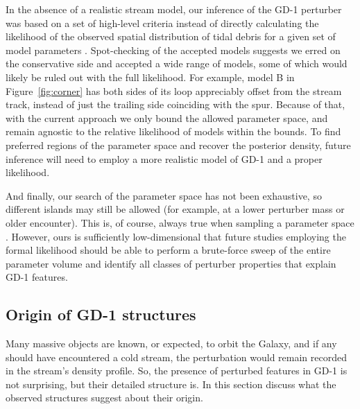 \documentclass[twocolumn]{aastex62}
\begin{document}
In the absence of a realistic stream model, our inference of the GD-1 perturber was based on a set of high-level criteria instead of directly calculating the likelihood of the observed spatial distribution of tidal debris for a given set of model parameters \citep[e.g., likelihood developed in][]{bonaca2014}.
Spot-checking of the accepted models suggests we erred on the conservative side and accepted a wide range of models, some of which would likely be ruled out with the full likelihood.
For example, model B in Figure~\ref{fig:corner} has both sides of its loop appreciably offset from the stream track, instead of just the trailing side coinciding with the spur.
Because of that, with the current approach we only bound the allowed parameter space, and remain agnostic to the relative likelihood of models within the bounds.
To find preferred regions of the parameter space and recover the posterior density, future inference will need to employ a more realistic model of GD-1 and a proper likelihood.

And finally, our search of the parameter space has not been exhaustive, so different islands may still be allowed (for example, at a lower perturber mass or older encounter).
This is, of course, always true when sampling a parameter space \citep[e.g.,][]{hoggdfm2018}.
However, ours is sufficiently low-dimensional that future studies employing the formal likelihood should be able to perform a brute-force sweep of the entire parameter volume and identify all classes of perturber properties that explain GD-1 features.

\subsection{Origin of GD-1 structures}
\label{sec:origin}
Many massive objects are known, or expected, to orbit the Galaxy, and if any should have encountered a cold stream, the perturbation would remain recorded in the stream's density profile.
So, the presence of perturbed features in GD-1 is not surprising, but their detailed structure is.
In this section discuss what the observed structures suggest about their origin.
\end{document}

